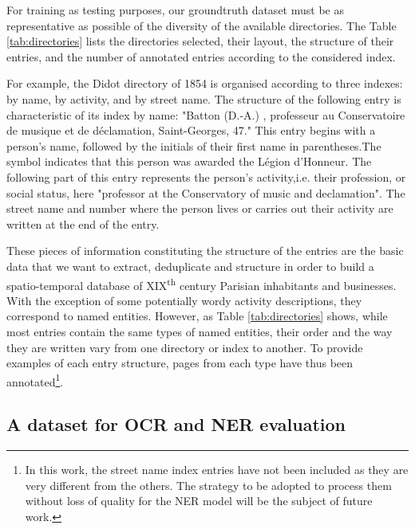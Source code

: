 For training as testing purposes, our groundtruth dataset must be as representative as possible of the diversity of the available directories. The Table \ref{tab:directories} lists the directories selected, their layout, the structure of their entries, and the number of annotated entries according to the considered index.

For example, the Didot directory of 1854 is organised according to three indexes: by name, by activity, and by street name. The structure of the following entry is characteristic of its index by name: "Batton (D.-A.) , professeur au Conservatoire de musique et de déclamation, Saint-Georges, 47." This entry begins with a person's name, followed by the initials of their first name in parentheses.The symbol indicates that this person was awarded the Légion d'Honneur. The following part of this entry represents the person's activity,i.e. their profession, or social status, here "professor at the Conservatory of music and declamation". The street name and number where the person lives or carries out their activity are written at the end of the entry.

These pieces of information constituting the structure of the entries are the basic data that we want to extract, deduplicate and structure in order to build a spatio-temporal database of XIX\textsuperscript{th} century Parisian inhabitants and businesses. With the exception of some potentially wordy activity descriptions, they correspond to named entities. However, as Table \ref{tab:directories} shows, while most entries contain the same types of named entities, their order and the way they are written vary from one directory or index to another. To provide examples of each entry structure, pages from each type have thus been annotated\footnote{In this work, the street name index entries have not been included as they are very different from the others. The strategy to be adopted to process them without loss of quality for the NER model will be the subject of future work.}.


\subsection{A dataset for OCR and NER evaluation}


